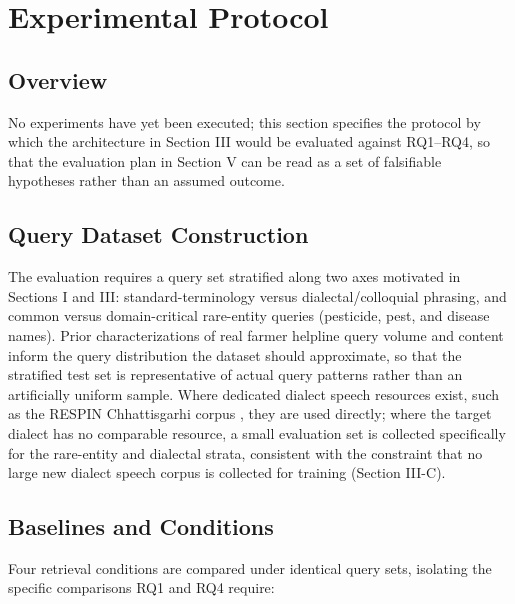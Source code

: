 \documentclass[conference]{IEEEtran}
\begin{document}
\section{Experimental Protocol}

\subsection{Overview}
No experiments have yet been executed; this section specifies the protocol by which the architecture in Section III would be evaluated against RQ1--RQ4, so that the evaluation plan in Section V can be read as a set of falsifiable hypotheses rather than an assumed outcome.

\subsection{Query Dataset Construction}
The evaluation requires a query set stratified along two axes motivated in Sections I and III: standard-terminology versus dialectal/colloquial phrasing, and common versus domain-critical rare-entity queries (pesticide, pest, and disease names). Prior characterizations of real farmer helpline query volume and content \cite{godara2022querycount,godara2020sequentialpattern} inform the query distribution the dataset should approximate, so that the stratified test set is representative of actual query patterns rather than an artificially uniform sample. Where dedicated dialect speech resources exist, such as the RESPIN Chhattisgarhi corpus \cite{singh2023respin}, they are used directly; where the target dialect has no comparable resource, a small evaluation set is collected specifically for the rare-entity and dialectal strata, consistent with the constraint that no large new dialect speech corpus is collected for training (Section III-C).

\subsection{Baselines and Conditions}
Four retrieval conditions are compared under identical query sets, isolating the specific comparisons RQ1 and RQ4 require:
\end{document}
